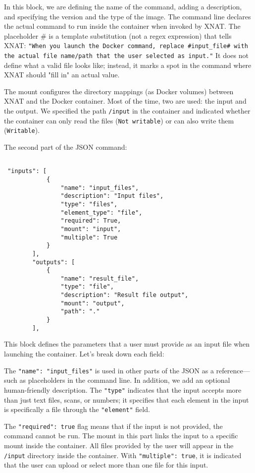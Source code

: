 In this block, we are defining the name of the command, adding a description, and specifying the version and the type of the image.
The command line declares the actual command to run inside the container when invoked by XNAT. The placeholder \# is a template substitution (not a regex expression) that tells XNAT: \texttt{"When you launch the Docker command, replace \#input\_file\# with the actual file name/path that the user selected as input."} It does not define what a valid file looks like; instead, it marks a spot in the command where XNAT should "fill in" an actual value.


The mount configures the directory mappings (as Docker volumes) between XNAT and the Docker container. Most of the time, two are used: the input and the output.
We specified the path \texttt{/input} in the container and indicated whether the container can only read the files (\texttt{Not writable}) or can also write them (\texttt{Writable}).

The second part of the JSON command:


\begin{lstlisting}

 "inputs": [
            {
                "name": "input_files",
                "description": "Input files",
                "type": "files",
                "element_type": "file",
                "required": True,
                "mount": "input",
                "multiple": True
            }
        ],
        "outputs": [
            {
                "name": "result_file",
                "type": "file",
                "description": "Result file output",
                "mount": "output",
                "path": "."
            }
        ],
\end{lstlisting}


This block defines the parameters that a user must provide as an input file when launching the container.
Let’s break down each field:

The \texttt{"name": "input\_files"} is used in other parts of the JSON as a reference---such as placeholders in the command line. In addition, we add an optional human-friendly description. The \texttt{"type"} indicates that the input accepts more than just text files, scans, or numbers; it specifies that each element in the input is specifically a file through the \texttt{"element"} field.

The \texttt{"required": true} flag means that if the input is not provided, the command cannot be run. The mount in this part links the input to a specific mount inside the container. All files provided by the user will appear in the \texttt{/input} directory inside the container. With \texttt{"multiple": true}, it is indicated that the user can upload or select more than one file for this input.


